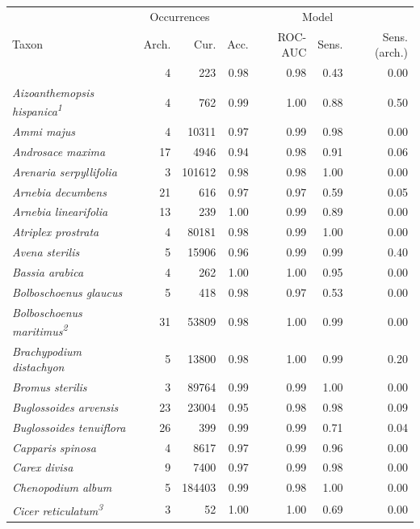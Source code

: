 \documentclass[
  authoryear,
  preprint]{elsarticle}
\begin{document}
\begin{longtable}{@{\extracolsep{\fill}}lrrrrrr}
\toprule
 & \multicolumn{2}{c}{Occurrences} & \multicolumn{4}{c}{Model} \\ 
\cmidrule(lr){2-3} \cmidrule(lr){4-7}
Taxon & Arch. & Cur. & Acc. & ROC-AUC & Sens. & Sens. (arch.) \\ 
\midrule\addlinespace[2.5pt]
{\itshape Aegilops crassa} & 4 & 223 & 0.98 & 0.98 & 0.43 & 0.00 \\ 
{\itshape Aizoanthemopsis hispanica}\textsuperscript{\textit{1}} & 4 & 762 & 0.99 & 1.00 & 0.88 & 0.50 \\ 
{\itshape Ammi majus} & 4 & 10311 & 0.97 & 0.99 & 0.98 & 0.00 \\ 
{\itshape Androsace maxima} & 17 & 4946 & 0.94 & 0.98 & 0.91 & 0.06 \\ 
{\itshape Arenaria serpyllifolia} & 3 & 101612 & 0.98 & 0.98 & 1.00 & 0.00 \\ 
{\itshape Arnebia decumbens} & 21 & 616 & 0.97 & 0.97 & 0.59 & 0.05 \\ 
{\itshape Arnebia linearifolia} & 13 & 239 & 1.00 & 0.99 & 0.89 & 0.00 \\ 
{\itshape Atriplex prostrata} & 4 & 80181 & 0.98 & 0.99 & 1.00 & 0.00 \\ 
{\itshape Avena sterilis} & 5 & 15906 & 0.96 & 0.99 & 0.99 & 0.40 \\ 
{\itshape Bassia arabica} & 4 & 262 & 1.00 & 1.00 & 0.95 & 0.00 \\ 
{\itshape Bolboschoenus glaucus} & 5 & 418 & 0.98 & 0.97 & 0.53 & 0.00 \\ 
{\itshape Bolboschoenus maritimus}\textsuperscript{\textit{2}} & 31 & 53809 & 0.98 & 1.00 & 0.99 & 0.00 \\ 
{\itshape Brachypodium distachyon} & 5 & 13800 & 0.98 & 1.00 & 0.99 & 0.20 \\ 
{\itshape Bromus sterilis} & 3 & 89764 & 0.99 & 0.99 & 1.00 & 0.00 \\ 
{\itshape Buglossoides arvensis} & 23 & 23004 & 0.95 & 0.98 & 0.98 & 0.09 \\ 
{\itshape Buglossoides tenuiflora} & 26 & 399 & 0.99 & 0.99 & 0.71 & 0.04 \\ 
{\itshape Capparis spinosa} & 4 & 8617 & 0.97 & 0.99 & 0.96 & 0.00 \\ 
{\itshape Carex divisa} & 9 & 7400 & 0.97 & 0.99 & 0.98 & 0.00 \\ 
{\itshape Chenopodium album} & 5 & 184403 & 0.99 & 0.98 & 1.00 & 0.00 \\ 
{\itshape Cicer reticulatum}\textsuperscript{\textit{3}} & 3 & 52 & 1.00 & 1.00 & 0.69 & 0.00 \\ 

\end{longtable}
\end{document}
